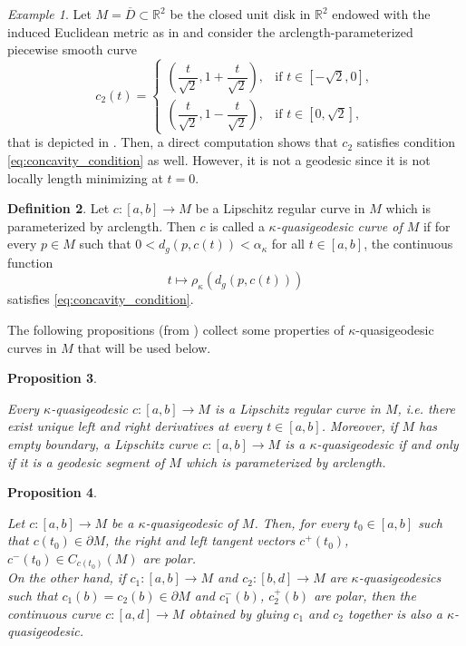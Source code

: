 \documentclass[11pt]{article}
\theoremstyle{definition}
\newtheorem{definition}{Definition}[section]
\theoremstyle{remark}
\newtheorem{example}[definition]{Example}
\theoremstyle{plain}
\newtheorem{proposition}[definition]{Proposition}
\newcommand{\R}{\mathbb{R}}
\begin{document}
\begin{example}\label{ex:billiard_example}
Let $M = \overline{D}\subset \R^2$ be the closed unit disk in $\R^2$ endowed with the induced Euclidean metric as in  and consider the arclength-parameterized piecewise smooth curve
$$c_2(t) = \begin{cases}
           \left(\dfrac{t}{\sqrt{2}},1+\dfrac{t}{\sqrt{2}}\right), & \mbox{if } t\in [-\sqrt{2},0],\\
           \left(\dfrac{t}{\sqrt{2}},1-\dfrac{t}{\sqrt{2}}\right), & \mbox{if } t\in [0,\sqrt{2}],
         \end{cases}$$
that is depicted in . Then, a direct computation shows that $c_2$ satisfies condition \cref{eq:concavity_condition} as well. However, it is not a geodesic since it is not locally length minimizing at $t=0$.
\end{example}

\begin{definition}

Let $c:[a,b]\rightarrow M$ be a Lipschitz regular curve in $M$ which is parameterized by arclength. Then $c$ is called a \textit{$\kappa$-quasigeodesic curve of $M$} if for every $p\in M$ such that $0<d_g(p,c(t))<\alpha_\kappa$ for all $t\in [a,b]$, the continuous function
$$t\mapsto \rho_\kappa(d_g(p,c(t)))$$
satisfies \cref{eq:concavity_condition}.

\end{definition}

The following propositions (from \cite{PetruninSemiconcave}) collect some properties of $\kappa$-quasigeodesic curves in $M$ that will be used below.

\begin{proposition}\label{prop:geodesic_quasigeodesic}

Every $\kappa$-quasigeodesic $c:[a,b]\rightarrow M$ is a Lipschitz regular curve in $M$, i.e. there exist unique left and right derivatives at every $t\in [a,b]$. Moreover, if $M$ has empty boundary, a Lipschitz curve $c:[a,b]\rightarrow M$ is a $\kappa$-quasigeodesic if and only if it is a geodesic segment of $M$ which is parameterized by arclength.

\end{proposition}

\begin{proposition}\label{prop:quasigeodesic_polar}

Let $c: [a,b]\rightarrow M$ be a $\kappa$-quasigeodesic of $M$. Then, for every $t_0\in[a,b]$ such that $c(t_0)\in \partial M$, the right and left tangent vectors $c^+(t_0)$, $c^-(t_0)\in C_{c(t_0)}(M)$ are polar. \\
On the other hand, if $c_1:[a,b]\rightarrow M$ and $c_2:[b,d]\rightarrow M$ are $\kappa$-quasigeodesics such that $c_1(b)=c_2(b)\in \partial M$ and $c_1^-(b)$, $c_2^+(b)$ are polar, then the continuous curve $c:[a,d]\rightarrow M$ obtained by gluing $c_1$ and $c_2$ together is also a $\kappa$-quasigeodesic.

\end{proposition}
\end{document}
